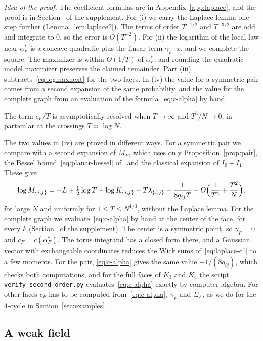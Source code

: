 \emph{Idea of the proof.} The coefficient formulas are in Appendix~\ref{app:laplace},
and the proof is in Section~ of the supplement. For (i) we carry the Laplace
lemma one step further (Lemma~\ref{lem:laplace2}). The terms of order $T^{-1/2}$ and $T^{-3/2}$
are odd and integrate to $0$, so the error is $O(T^{-2})$. For (ii) the logarithm of the local law
near $\alpha^*_F$ is a concave quadratic plus the linear term $\gamma_F\cdot x$, and we complete
the square. The maximizer is within $O(1/T)$ of $\alpha^*_F$, and rounding the
quadratic-model maximizer preserves the claimed remainder. Part (iii)
subtracts~\eqref{eq:logmaxnext} for the two faces. In (iv) the value for a symmetric pair
comes from a second expansion of the same probability, and the value for the complete
graph from an evaluation of the formula~\eqref{eq:c-alpha} by hand.

The term $c_F/T$ is asymptotically resolved when $T\to\infty$ and $T^3/N\to0$,
in particular at the crossings $T\asymp\log N$.

The two values in (iv) are proved in different ways. For a symmetric pair we compare
with a second expansion of $M_F$, which uses only Proposition~\ref{prop:pair}, the Bessel
bound~\eqref{eq:planar-bessel} of~\cite{paperA} and the classical expansion of $I_0+I_1$.
These give
\begin{equation}\label{eq:pairnext}
\log M_{\{i,j\}}=-L+\tfrac12\log T+\log K_{\{i,j\}}-T\lambda_{\{i,j\}}-\frac1{8q_{ij}T}
+O\Bigl(\frac1{T^2}+\frac{T^2}N\Bigr),
\end{equation}
for large $N$ and uniformly for $1\le T\le N^{1/3}$, without the Laplace lemma. For the
complete graph we evaluate~\eqref{eq:c-alpha} by hand at the center of the face, for every
$k$ (Section~ of the supplement). The center is a symmetric point, so $\gamma_F=0$ and
$c_F=c(\alpha^*_F)$. The torus integrand has a closed form there, and a Gaussian vector
with exchangeable coordinates reduces the Wick sums of~\eqref{eq:laplace-c1} to a few
moments. For the pair, \eqref{eq:c-alpha} gives the same value $-1/(8q_{ij})$, which checks
both computations, and for the full faces of $K_3$ and $K_4$ the script
\texttt{verify\_second\_order.py} evaluates~\eqref{eq:c-alpha} exactly by computer algebra.
For other faces $c_F$ has to be computed from~\eqref{eq:c-alpha}, $\gamma_F$ and
$\Sigma_F$, as we do for the $4$-cycle in Section~\ref{sec:examples}.


\subsection{A weak field}\label{sec:weakfield}

